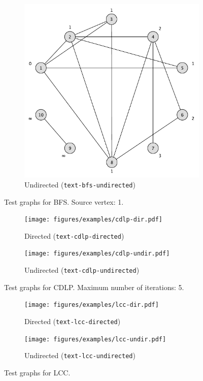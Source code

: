 \begin{figure}[h]
\begin{subfigure}{0.496\textwidth}
		\includegraphics[scale=\examplescale]{figures/examples/bfs-undir.pdf}
		\caption{Undirected (\texttt{text-bfs-undirected})}
	\end{subfigure}
	\caption{Test graphs for BFS. Source vertex: 1.}
	\label{fig:bfs_example}
\end{figure}

\begin{figure}[h]
	\centering
	\begin{subfigure}{0.496\textwidth}
		\centering
		\texttt{[image: figures/examples/cdlp-dir.pdf]}
		\caption{Directed (\texttt{text-cdlp-directed})}
	\end{subfigure}
	\begin{subfigure}{0.496\textwidth}
		\centering
		\texttt{[image: figures/examples/cdlp-undir.pdf]}
		\caption{Undirected (\texttt{text-cdlp-undirected})}
	\end{subfigure}
	\caption{Test graphs for CDLP. Maximum number of iterations: 5.}
	\label{fig:cdlp_example}
\end{figure}

\begin{figure}[h]
	\centering
	\begin{subfigure}{0.496\textwidth}
		\centering
		\texttt{[image: figures/examples/lcc-dir.pdf]}
		\caption{Directed (\texttt{text-lcc-directed})}
	\end{subfigure}
	\begin{subfigure}{0.496\textwidth}
		\centering
		\texttt{[image: figures/examples/lcc-undir.pdf]}
		\caption{Undirected (\texttt{text-lcc-undirected})}
	\end{subfigure}
	\caption{Test graphs for LCC.}
	\label{fig:lcc_example}
\end{figure}

